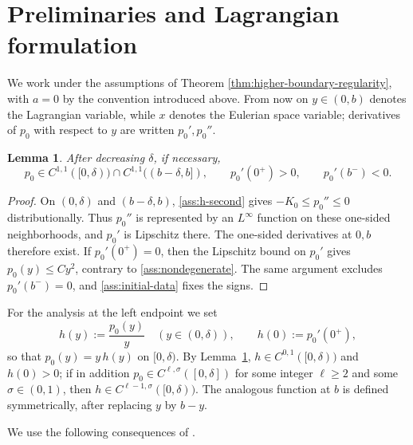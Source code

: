 \documentclass[11pt]{amsart}
\newtheorem{lemma}[theorem]{Lemma}
\begin{document}
\section{Preliminaries and Lagrangian formulation}
\label{sec:preliminaries}

We work under the assumptions of Theorem
\ref{thm:higher-boundary-regularity}, with \(a=0\) by the convention
introduced above. From now on \(y\in(0,b)\) denotes the Lagrangian variable,
while \(x\) denotes the Eulerian space variable; derivatives of \(p_0\) with
respect to \(y\) are written \(p_0',p_0''\).

\begin{lemma}
\label{lem:h-boundary}
After decreasing \(\delta\), if necessary,
\begin{equation*}
        p_0\in C^{1,1}([0,\delta))\cap C^{1,1}((b-\delta,b]),
        \qquad p_0'(0^+)>0,\qquad p_0'(b^-)<0 .
\end{equation*}
\end{lemma}

\begin{proof}
On \((0,\delta)\) and \((b-\delta,b)\), \eqref{ass:h-second} gives
\(-K_0\le p_0''\le0\) distributionally. Thus \(p_0''\) is represented by an
\(L^\infty\) function on these one-sided neighborhoods, and \(p_0'\) is Lipschitz there.
The one-sided derivatives at \(0,b\) therefore exist. If \(p_0'(0^+)=0\), then
the Lipschitz bound on \(p_0'\) gives \(p_0(y)\le Cy^2\), contrary to
\eqref{ass:nondegenerate}. The same argument excludes \(p_0'(b^-)=0\), and
\eqref{ass:initial-data} fixes the signs.
\end{proof}

For the analysis at the left endpoint we set
\begin{equation}
\label{eq:h-def}
        h(y):=\frac{p_0(y)}{y}\quad(y\in(0,\delta)),\qquad
        h(0):=p_0'(0^+),
\end{equation}
so that \(p_0(y)=y\,h(y)\) on \([0,\delta)\). By
Lemma~\ref{lem:h-boundary}, \(h\in C^{0,1}([0,\delta))\) and \(h(0)>0\); if
in addition \(p_0\in C^{\ell,\sigma}([0,\delta])\) for some integer
\(\ell\ge2\) and some \(\sigma\in(0,1)\), then
\(h\in C^{\ell-1,\sigma}([0,\delta))\). The analogous function at \(b\) is
defined symmetrically, after replacing \(y\) by \(b-y\).

We use the following consequences of
\cite[Thms.~4.3 and~4.10, Cor.~4.11, Prop.~4.13]{CMP}.
\end{document}
